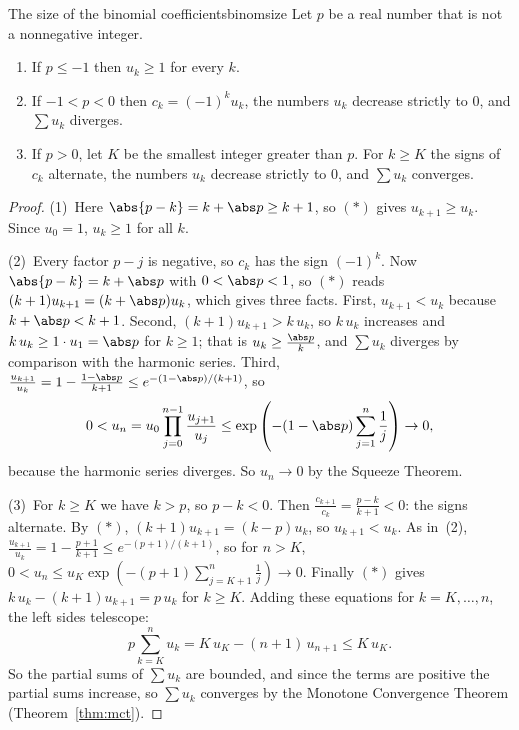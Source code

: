 \documentclass[11pt]{article}
\begin{document}
\begin{thm}{The size of the binomial coefficients}{binomsize}
Let $p$ be a real number that is not a nonnegative integer.
\begin{enumerate}
  \item If $p\le-1$ then $u_k\ge1$ for every $k$.
  \item If $-1<p<0$ then $c_k=(-1)^ku_k$, the numbers $u_k$ decrease strictly to $0$, and $\sum u_k$ diverges.
  \item If $p>0$, let $K$ be the smallest integer greater than $p$. For $k\ge K$ the signs of $c_k$ alternate, the numbers $u_k$ decrease strictly to $0$, and $\sum u_k$ converges.
\end{enumerate}
\end{thm}
\begin{proof}
(1)~Here $\abs{p-k}=k+\abs p\ge k+1$, so $(\ast)$ gives $u_{k+1}\ge u_k$. Since $u_0=1$, $u_k\ge1$ for all $k$.

(2)~Every factor $p-j$ is negative, so $c_k$ has the sign $(-1)^k$. Now $\abs{p-k}=k+\abs p$ with $0<\abs p<1$, so $(\ast)$ reads $(k+1)u_{k+1}=(k+\abs p)u_k$, which gives three facts. First, $u_{k+1}<u_k$ because $k+\abs p<k+1$. Second, $(k+1)u_{k+1}>k\,u_k$, so $k\,u_k$ increases and $k\,u_k\ge1\cdot u_1=\abs p$ for $k\ge1$; that is $u_k\ge\frac{\abs p}k$, and $\sum u_k$ diverges by comparison with the harmonic series. Third, $\frac{u_{k+1}}{u_k}=1-\frac{1-\abs p}{k+1}\le e^{-(1-\abs p)/(k+1)}$, so
\[
0<u_n=u_0\prod_{j=0}^{n-1}\frac{u_{j+1}}{u_j}\le\exp\left(-(1-\abs p)\sum_{j=1}^n\frac1j\right)\to0,
\]
because the harmonic series diverges. So $u_n\to0$ by the Squeeze Theorem.

(3)~For $k\ge K$ we have $k>p$, so $p-k<0$. Then $\frac{c_{k+1}}{c_k}=\frac{p-k}{k+1}<0$: the signs alternate. By $(\ast)$, $(k+1)u_{k+1}=(k-p)u_k$, so $u_{k+1}<u_k$. As in~(2), $\frac{u_{k+1}}{u_k}=1-\frac{p+1}{k+1}\le e^{-(p+1)/(k+1)}$, so for $n>K$, $0<u_n\le u_K\exp\left(-(p+1)\sum_{j=K+1}^n\frac1j\right)\to0$. Finally $(\ast)$ gives $k\,u_k-(k+1)u_{k+1}=p\,u_k$ for $k\ge K$. Adding these equations for $k=K,\dots,n$, the left sides telescope:
\[
p\sum_{k=K}^nu_k=K\,u_K-(n+1)\,u_{n+1}\le K\,u_K .
\]
So the partial sums of $\sum u_k$ are bounded, and since the terms are positive the partial sums increase, so $\sum u_k$ converges by the Monotone Convergence Theorem (Theorem~\ref{thm:mct}).
\end{proof}
\end{document}
